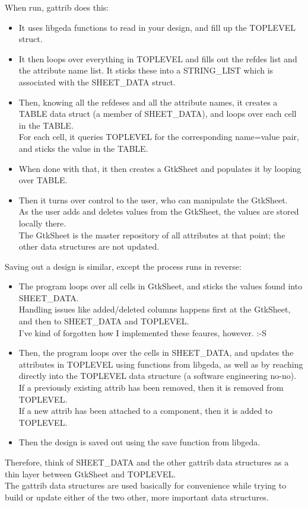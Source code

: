   When run, gattrib does this:\\ 
\begin{itemize}
\item It uses libgeda functions to read in your design, and fill up the TOPLEVEL struct. 
\item It then loops over everything in TOPLEVEL and fills out the refdes list and the attribute name list. It sticks these into a STRING\_LIST which is associated with the SHEET\_DATA struct. 
\item Then, knowing all the refdeses and all the attribute names, it creates a TABLE data struct (a member of SHEET\_DATA), and loops over each cell in the TABLE.\\ 
 For each cell, it queries TOPLEVEL for the corresponding name=value pair, and sticks the value in the TABLE. 
\item When done with that, it then creates a GtkSheet and populates it by looping over TABLE. 
\item Then it turns over control to the user, who can manipulate the GtkSheet.\\ 
 As the user adds and deletes values from the GtkSheet, the values are stored locally there.\\ 
 The GtkSheet is the master repository of all attributes at that point; the other data structures are not updated. 

\end{itemize}
 Saving out a design is similar, except the process runs in reverse:\\ 
\begin{itemize}
\item The program loops over all cells in GtkSheet, and sticks the values found into SHEET\_DATA.\\ 
 Handling issues like added/deleted columns happens first at the GtkSheet, and then to SHEET\_DATA and TOPLEVEL.\\ 
 I've kind of forgotten how I implemented these feaures, however. :-S 
\item Then, the program loops over the cells in SHEET\_DATA, and updates the attributes in TOPLEVEL using functions from libgeda, as well as by reaching directly into the TOPLEVEL data structure (a software engineering no-no).\\ 
 If a previously existing attrib has been removed, then it is removed from TOPLEVEL.\\ 
 If a new attrib has been attached to a component, then it is added to TOPLEVEL. 
\item Then the design is saved out using the save function from libgeda. 

\end{itemize}

  Therefore, think of SHEET\_DATA and the other gattrib data structures as a thin layer between GtkSheet and TOPLEVEL.\\ 
 The gattrib data structures are used basically for convenience while trying to build or update either of the two other, more important data structures.

